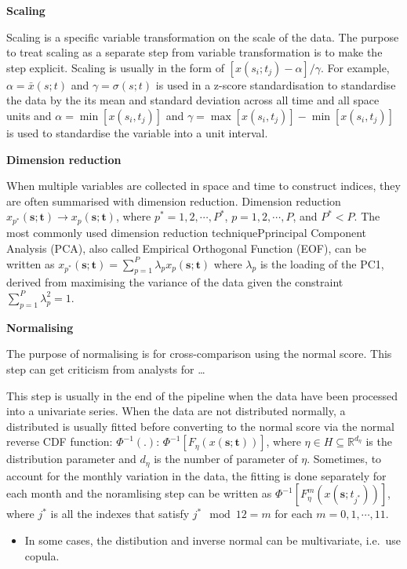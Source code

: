\documentclass[
  letterpaper,
  DIV=11,
  numbers=noendperiod]{scrartcl}
\providecommand{\tightlist}{%
  \setlength{\itemsep}{0pt}\setlength{\parskip}{0pt}}\usepackage{longtable,booktabs,array}
\begin{document}
\textbf{Scaling}

Scaling is a specific variable transformation on the scale of the data.
The purpose to treat scaling as a separate step from variable
transformation is to make the step explicit. Scaling is usually in the
form of \([x(s_i;t_j) - \alpha]/\gamma\). For example,
\(\alpha = \bar{x}(s; t)\) and \(\gamma = \sigma(s; t)\) is used in a
z-score standardisation to standardise the data by the its mean and
standard deviation across all time and all space units and
\(\alpha = \min[x(s_i, t_j)]\) and
\(\gamma = \max[x(s_i, t_j)] - \min[x(s_i, t_j)]\) is used to
standardise the variable into a unit interval.

\textbf{Dimension reduction}

When multiple variables are collected in space and time to construct
indices, they are often summarised with dimension reduction. Dimension
reduction
\(x_{p^*}(\mathbf{s}; \mathbf{t}) \rightarrow x_p(\mathbf{s}; \mathbf{t})\),
where \(p^* = 1, 2, \cdots, P^*\), \(p = 1, 2, \cdots, P\), and
\(P^* < P\). The most commonly used dimension reduction
techniquePprincipal Component Analysis (PCA), also called Empirical
Orthogonal Function (EOF), can be written as
\(x_{p^*}(\mathbf{s}; \mathbf{t}) = \sum_{p = 1}^{P}\lambda_{p}x_p(\mathbf{s};\mathbf{t})\)
where \(\lambda_p\) is the loading of the PC1, derived from maximising
the variance of the data given the constraint
\(\sum_{p=1}^P\lambda_p^2 = 1\).

\textbf{Normalising}

The purpose of normalising is for cross-comparison using the normal
score. This step can get criticism from analysts for \ldots{}

This step is usually in the end of the pipeline when the data have been
processed into a univariate series. When the data are not distributed
normally, a distributed is usually fitted before converting to the
normal score via the normal reverse CDF function: \(\Phi^{-1}(.)\):
\(\Phi^{-1}[F_{\eta}(x(\mathbf{s}; \mathbf{t}))]\), where
\(\eta \in H \subseteq \mathbb{R}^{d_{\eta}}\) is the distribution
parameter and \(d_{\eta}\) is the number of parameter of \(\eta\).
Sometimes, to account for the monthly variation in the data, the fitting
is done separately for each month and the noramlising step can be
written as \(\Phi^{-1}[F_{\eta}^m(x(\mathbf{s};t_{j^*}))]\), where
\(j^*\) is all the indexes that satisfy \(j^* \mod 12 = m\) for each
\(m = 0, 1,\cdots, 11\).

\begin{itemize}
\tightlist
\item
  In some cases, the distibution and inverse normal can be multivariate,
  i.e.~use copula.
\end{itemize}
\end{document}
